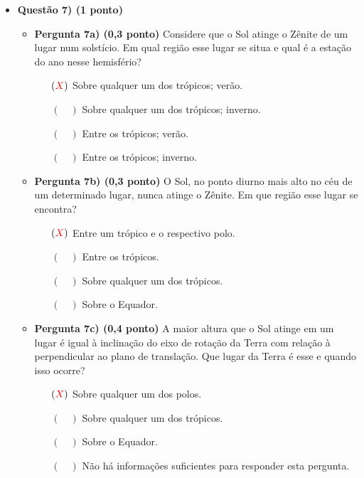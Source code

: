 \documentclass[a4paper, 12pt]{article}
\newcommand{\red}[1]{\textcolor{red}{#1}}
\begin{document}
\begin{flushleft}
\begin{itemize}
            \item \textbf{Questão 7) (1 ponto)}
                \begin{itemize}
                    \item \textbf{Pergunta 7a) (0,3 ponto)} Considere que o Sol atinge o Zênite de um lugar num solstício. Em qual região esse lugar se situa e qual é a estação do ano nesse hemisfério?
                        \begin{itemize}
                            \item[$(\red{X})$] Sobre qualquer um dos trópicos; verão.
                            \item[$(\quad)$] Sobre qualquer um dos trópicos; inverno.
                            \item[$(\quad)$] Entre os trópicos; verão.
                            \item[$(\quad)$] Entre os trópicos; inverno.
                        \end{itemize}
                    \item \textbf{Pergunta 7b) (0,3 ponto)} O Sol, no ponto diurno mais alto no céu de um determinado lugar, nunca atinge o Zênite. Em que região esse lugar se encontra?
                        \begin{itemize}
                            \item[$(\red{X})$] Entre um trópico e o respectivo polo.
                            \item[$(\quad)$] Entre os trópicos.
                            \item[$(\quad)$] Sobre qualquer um dos trópicos.
                            \item[$(\quad)$] Sobre o Equador.
                        \end{itemize}
                    \item \textbf{Pergunta 7c) (0,4 ponto)} A maior altura que o Sol atinge em um lugar é igual à inclinação do eixo de rotação da Terra com relação à perpendicular ao plano de translação. Que lugar da Terra é esse e quando isso ocorre?
                        \begin{itemize}
                            \item[$(\red{X})$] Sobre qualquer um dos polos.
                            \item[$(\quad)$] Sobre qualquer um dos trópicos.
                            \item[$(\quad)$] Sobre o Equador.
                            \item[$(\quad)$] Não há informações suficientes para responder esta pergunta.
                        \end{itemize}
                \end{itemize}
        \end{itemize} \end{flushleft}
\end{document}
